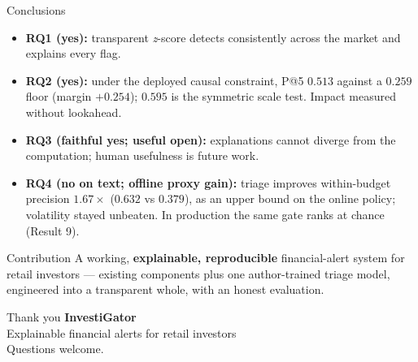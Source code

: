 \documentclass[aspectratio=169]{beamer}
\begin{document}
\begin{frame}{Conclusions}
\begin{itemize}
  \item \textbf{RQ1 (yes):} transparent \emph{z}-score detects consistently across the market and explains every flag.
  \item \textbf{RQ2 (yes):} under the deployed causal constraint, P@5 $0.513$ against a $0.259$ floor (margin $+0.254$); $0.595$ is the symmetric scale test. Impact measured without lookahead.
  \item \textbf{RQ3 (faithful yes; useful open):} explanations cannot diverge from the computation; human usefulness is future work.
  \item \textbf{RQ4 (no on text; offline proxy gain):} triage improves within-budget precision $1.67\times$ ($0.632$ vs $0.379$), as an upper bound on the online policy; volatility stayed unbeaten. In production the same gate ranks at chance (Result 9).
\end{itemize}
\vfill
\begin{block}{Contribution}
A working, \textbf{explainable, reproducible} financial-alert system for retail investors --- existing components plus one author-trained triage model, engineered into a transparent whole, with an honest evaluation.
\end{block}
\end{frame}

\begin{frame}{Thank you}
\vfill
\centering
{\Huge \textbf{InvestiGator}} \\[4mm]
{\large Explainable financial alerts for retail investors} \\[8mm]
{\footnotesize Questions welcome.}
\vfill
\end{frame}
\end{document}
